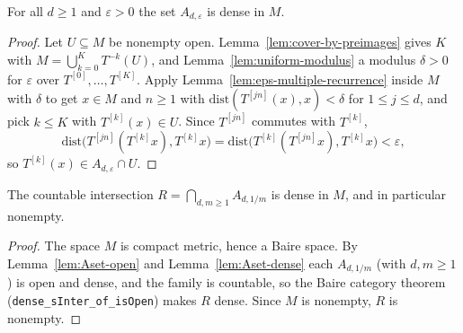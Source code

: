 \begin{lemma}
    \label{lem:Aset-dense}
    \leanok
    For all $d \ge 1$ and $\varepsilon > 0$ the set $A_{d,\varepsilon}$ is dense
    in $M$.
\end{lemma}
\begin{proof}
    Let $U \subseteq M$ be nonempty open. Lemma~\ref{lem:cover-by-preimages}
    gives $K$ with $M = \bigcup_{k=0}^{K} T^{-k}(U)$, and
    Lemma~\ref{lem:uniform-modulus} a modulus $\delta > 0$ for $\varepsilon$ over
    $T^{[0]}, \dots, T^{[K]}$. Apply Lemma~\ref{lem:eps-multiple-recurrence}
    inside $M$ with $\delta$ to get $x \in M$ and $n \ge 1$ with
    $\mathrm{dist}(T^{[j n]}(x), x) < \delta$ for $1 \le j \le d$, and pick
    $k \le K$ with $T^{[k]}(x) \in U$. Since $T^{[j n]}$ commutes with $T^{[k]}$,
    \[
        \mathrm{dist}\bigl(T^{[j n]}(T^{[k]}x), T^{[k]}x\bigr)
        = \mathrm{dist}\bigl(T^{[k]}(T^{[j n]}x), T^{[k]}x\bigr)
        < \varepsilon ,
    \]
    so $T^{[k]}(x) \in A_{d,\varepsilon} \cap U$.
\end{proof}

\begin{lemma}
    \label{lem:recurrence-residual-nonempty}
    \leanok
    The countable intersection $R = \bigcap_{d, m \ge 1} A_{d, 1/m}$ is dense in
    $M$, and in particular nonempty.
\end{lemma}
\begin{proof}
    The space $M$ is compact metric, hence a Baire space. By
    Lemma~\ref{lem:Aset-open} and Lemma~\ref{lem:Aset-dense} each $A_{d, 1/m}$
    (with $d, m \ge 1$) is open and dense, and the family is countable, so the
    Baire category theorem (\texttt{dense\_sInter\_of\_isOpen}) makes $R$ dense.
    Since $M$ is nonempty, $R$ is nonempty.
\end{proof}

